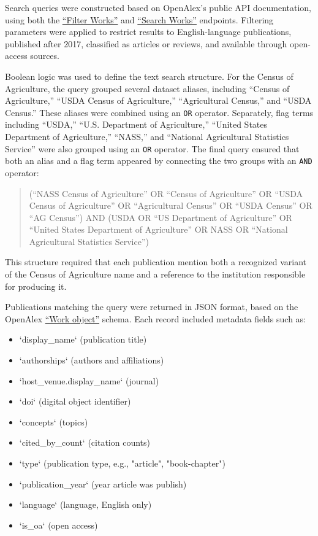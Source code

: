 \documentclass[
  letterpaper,
  DIV=11,
  numbers=noendperiod]{scrartcl}
\begin{document}
Search queries were constructed based on OpenAlex's public API
documentation, using both the
\href{https://docs.openalex.org/api-entities/works/filter-works}{``Filter
Works''} and
\href{https://docs.openalex.org/api-entities/works/search-works}{``Search
Works''} endpoints. Filtering parameters were applied to restrict
results to English-language publications, published after 2017,
classified as articles or reviews, and available through open-access
sources.

Boolean logic was used to define the text search structure. For the
Census of Agriculture, the query grouped several dataset aliases,
including ``Census of Agriculture,'' ``USDA Census of Agriculture,''
``Agricultural Census,'' and ``USDA Census.'' These aliases were
combined using an \texttt{OR} operator. Separately, flag terms including
``USDA,'' ``U.S. Department of Agriculture,'' ``United States Department
of Agriculture,'' ``NASS,'' and ``National Agricultural Statistics
Service'' were also grouped using an \texttt{OR} operator. The final
query ensured that both an alias and a flag term appeared by connecting
the two groups with an \texttt{AND} operator:

\begin{quote}
(``NASS Census of Agriculture'' OR ``Census of Agriculture'' OR ``USDA
Census of Agriculture'' OR ``Agricultural Census'' OR ``USDA Census'' OR
``AG Census'') AND (USDA OR ``US Department of Agriculture'' OR ``United
States Department of Agriculture'' OR NASS OR ``National Agricultural
Statistics Service'')
\end{quote}

This structure required that each publication mention both a recognized
variant of the Census of Agriculture name and a reference to the
institution responsible for producing it.

Publications matching the query were returned in JSON format, based on
the OpenAlex
\href{https://docs.openalex.org/api-entities/works/work-object}{``Work
object''} schema. Each record included metadata fields such as:

\begin{itemize}
  \item `display_name` (publication title)
  \item `authorships` (authors and affiliations)
  \item `host_venue.display_name` (journal)
  \item `doi` (digital object identifier)
  \item `concepts` (topics)
  \item `cited_by_count` (citation counts)
  \item `type` (publication type, e.g., "article", "book-chapter")
  \item `publication_year` (year article was publish)
  \item `language` (language, English only)
  \item `is_oa` (open access)
\end{itemize}
\end{document}
